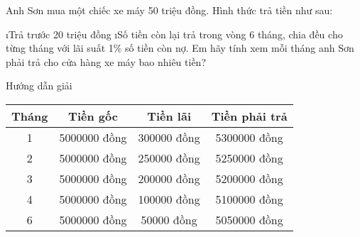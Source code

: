 \begin{bt}
	Anh Sơn mua một chiếc xe máy 50 triệu đồng. Hình thức trả tiền như sau:
	\begin{enumerate}[--,leftmargin=*]
		\i Trả trước 20 triệu đồng
		\i Số tiền còn lại trả trong vòng 6 tháng, chia đều cho từng tháng với lãi suất 1\% số tiền còn nợ. Em hãy tính xem mỗi tháng anh Sơn phải trả cho cửa hàng xe máy bao nhiêu tiền?
	\end{enumerate}
	\begin{loigiaichuong32}
		Hướng dẫn giải
		\begin{center}
			\begin{tabular}{|c|c|c|c|}
			\hline
			Tháng&Tiền gốc	&Tiền lãi&	Tiền phải trả\\
			\hline
			1&	5000000 đồng&	300000 đồng&	5300000 đồng\\
			\hline
			2&	5000000 đồng&	250000 đồng&	5250000 đồng\\
			\hline
			3&	5000000 đồng&	200000 đồng&	5200000 đồng\\
			\hline
			4&	5000000 đồng&	100000 đồng&	5100000 đồng\\
			\hline
			6&	5000000 đồng&	50000 đồng&	5050000 đồng\\
			\hline
		\end{tabular}
		\end{center}
	\end{loigiaichuong32}
\end{bt} 

